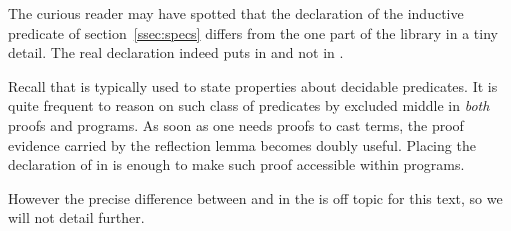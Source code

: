 The curious reader may have spotted that the declaration of the
 inductive predicate of section~\ref{ssec:specs} differs
from the one part of the \mcbMC{} library in a tiny detail.
The real declaration indeed puts  in  and not in
.

Recall that  is typically used to state properties about
decidable predicates. It is quite frequent to reason on such
class of predicates by excluded middle in \emph{both} proofs and programs.
As soon as one needs proofs to cast terms, the proof evidence carried by
the reflection lemma becomes doubly useful.  Placing the declaration of
 in  is enough to make such proof
accessible within programs.

However the precise difference between  and  in the
\mcbCIC{} is off topic for this text, so we will not detail further.

